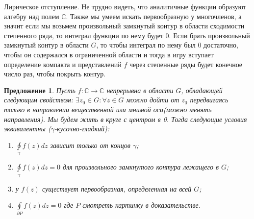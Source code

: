 \documentclass[12pt,a4paper]{article} %
\newtheorem{proposition}{Предложение}
\newcommand{\Co}{\mathbb{C}}
\begin{document}
	Лирическое отступление. Не трудно видеть, что аналитичные функции образуют алгебру над полем $\Co$. Также мы умеем искать первообразную у многочленов, а значит если мы возьмем произвольный замкнутый контур в области сходимости степенного ряда, то интеграл функции по нему будет 0. Если брать произвольный замкнутый контур в области $G$, то чтобы интеграл по нему был 0 достаточно, чтобы он содержался в ограниченной области и тогда в игру вступает определение компакта и представлений $f$ через степенные ряды будет конечное число раз, чтобы покрыть контур.
	
	\begin{proposition}\label{равнос для инт в круге}
		Пусть $f:\Co\rightarrow\Co$ непрерывна в области $G$, обладающей следующим свойством: $\exists z_0\in G:\forall z\in G$ можно дойти от $z_0$ передвигаясь только в направлении вещественной или мнимой оси(можно менять направления). Мы будем жить в круге с центром в 0. Тогда следующие условия эквивалентны ($\gamma$-кусочно-гладкий):
		\begin{enumerate}
			\item $\displaystyle\oint\limits_\gamma f(z)dz$ зависит только от концов $\gamma$;
			\item $\displaystyle\oint\limits_\gamma f(z)dz=0$ для произвольного замкнутого контура лежащего в $G$;
			\item у $f(z)$ существует первообразная, определенная на всей $G$;
			\item $\displaystyle\oint\limits_{\partial P} f(z)dz=0$ где $P$-смотреть картинку в доказательстве.
		\end{enumerate}
	\end{proposition}
\end{document}
